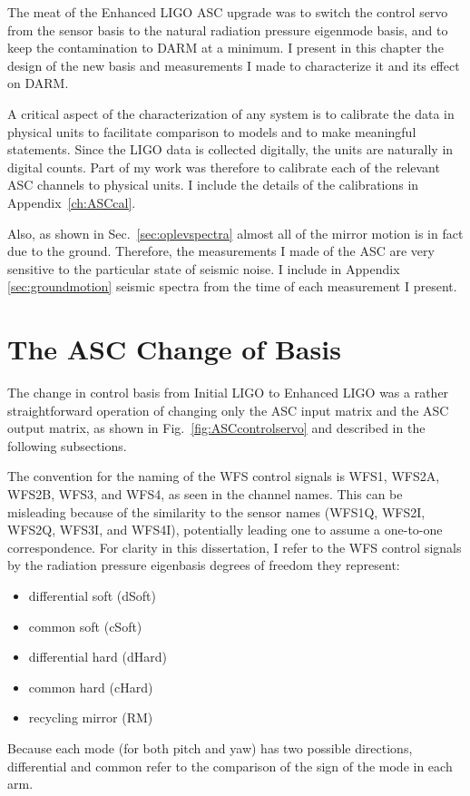 The meat of the Enhanced LIGO ASC upgrade was to switch the control
servo from the sensor basis to the natural radiation pressure
eigenmode basis, and to keep the contamination to DARM at a minimum. I
present in this chapter the design of the new basis and measurements I
made to characterize it and its effect on DARM.

A critical aspect of the characterization of any system is to
calibrate the data in physical units to facilitate comparison to
models and to make meaningful statements. Since the LIGO data is
collected digitally, the units are naturally in digital counts. Part
of my work was therefore to calibrate each of the relevant ASC
channels to physical units. I include the details of the calibrations
in Appendix~\ref{ch:ASCcal}.

Also, as shown in Sec.~\ref{sec:oplevspectra} almost all of the mirror
motion is in fact due to the ground. Therefore, the measurements I
made of the ASC are very sensitive to the particular state of seismic
noise. I include in Appendix \ref{sec:groundmotion} seismic spectra
from the time of each measurement I present.




\section{The ASC Change of Basis}
The change in control basis from Initial LIGO to Enhanced LIGO was a
rather straightforward operation of changing only the ASC input matrix
and the ASC output matrix, as shown in Fig.~\ref{fig:ASCcontrolservo} and
described in the following subsections.

The convention for the naming of the WFS control signals is WFS1,
WFS2A, WFS2B, WFS3, and WFS4, as seen in the channel names. This can
be misleading because of the similarity to the sensor names (WFS1Q,
WFS2I, WFS2Q, WFS3I, and WFS4I), potentially leading one to assume a
one-to-one correspondence. For clarity in this dissertation, I refer
to the WFS control signals by the radiation pressure eigenbasis
degrees of freedom they represent: 
\begin{itemize}
\item differential soft (dSoft) \\
\item common soft (cSoft) \\
\item differential hard (dHard) \\
\item common hard (cHard) \\
\item recycling mirror (RM)
\end{itemize}
Because each mode (for both pitch and yaw) has two possible
directions, differential and common refer to the comparison of the
sign of the mode in each arm.

